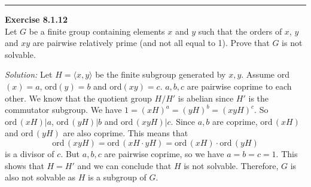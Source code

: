 \documentclass[a4paper, 12pt]{article}
\newenvironment{problem}[2][Exercise]
    { \begin{mdframed}[backgroundcolor=gray!20] \textbf{#1 #2} \\}
    {  \end{mdframed}}
\newenvironment{solution}
    {\textit{Solution:}}
    {}
\newcommand{\la}{\langle}
\newcommand{\ra}{\rangle}
\newcommand{\ord}{\text{ord}\,}
\begin{document}
\noindent\rule{7in}{2.8pt}
\begin{problem}{8.1.12}
Let \(G\) be a finite group containing elements \(x\) and \(y\) such that the orders of \(x\), \(y\) and \(xy\) are pairwise relatively prime (and not all equal to 1). Prove that \(G\) is not solvable.
\end{problem}
\begin{solution}
Let \(H=\la x,y\ra\) be the finite subgroup generated by \(x,y\). Assume ord\((x)=a\), ord\((y)=b\) and ord\((xy)=c\). \(a,b,c\) are pairwise coprime to each other. We know that the quotient group \(H/H'\) is abelian since 
\(H'\) is the commutator subgroup. We have \(1=(xH)^a=(yH)^b=(xyH)^c\). So \(\ord (xH)|a\), \(\ord (yH)|b\) and \(\ord (xyH)|c\). Since \(a,b\) are coprime, \(\ord (xH)\) and \(\ord (yH)\) are also coprime. This means that 
\[\ord (xyH)=\ord(xH\cdot yH)=\ord (xH) \cdot \ord (yH)\]
is a divisor of \(c\). But \(a,b,c\) are pairwise coprime, so we have \(a=b=c=1\). This shows that \(H=H'\) and we can conclude that \(H\) is not solvable. Therefore, \(G\) is also not solvable as \(H\) is a subgroup of \(G\).
\end{solution}
\end{document}
